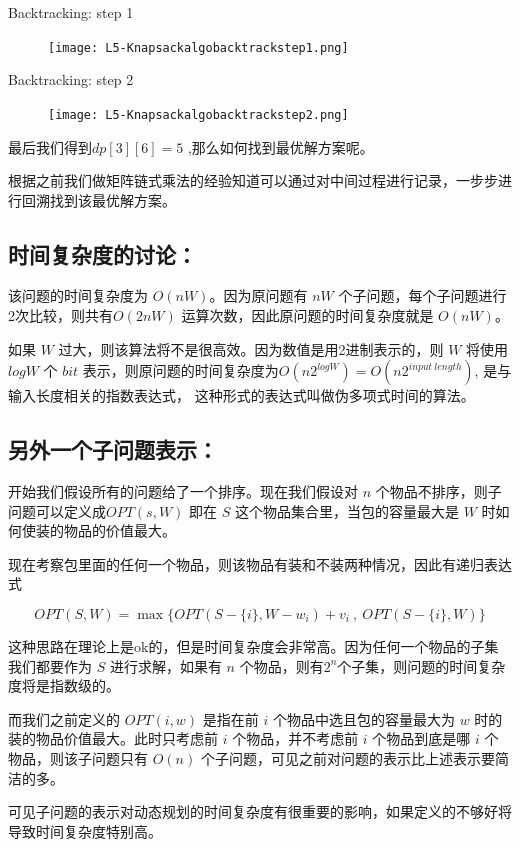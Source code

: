     Backtracking: step 1
	\begin{figure}
	\texttt{[image: L5-Knapsackalgobacktrackstep1.png]}
	\end{figure}

    Backtracking: step 2
	\begin{figure}
	\texttt{[image: L5-Knapsackalgobacktrackstep2.png]}
	\end{figure}

\newpage

最后我们得到$dp[3][6] = 5$ ,那么如何找到最优解方案呢。

根据之前我们做矩阵链式乘法的经验知道可以通过对中间过程进行记录，一步步进行回溯找到该最优解方案。

\subsection{时间复杂度的讨论：}

该问题的时间复杂度为 $O(nW)$。因为原问题有 $nW$ 个子问题，每个子问题进行2次比较，则共有$O(2nW)$ 运算次数，因此原问题的时间复杂度就是 $O(nW)$。

如果 $W$ 过大，则该算法将不是很高效。因为数值是用2进制表示的，则 $W$ 将使用 $logW$ 个 $bit$ 表示，则原问题的时间复杂度为$O(n2^{logW}) = O(n2^{input ~ length})$, 是与输入长度相关的指数表达式， 这种形式的表达式叫做伪多项式时间的算法。

\subsection{另外一个子问题表示：}

开始我们假设所有的问题给了一个排序。现在我们假设对 $n$ 个物品不排序，则子问题可以定义成$OPT(s,W)$ 即在 $S$ 这个物品集合里，当包的容量最大是 $W$ 时如何使装的物品的价值最大。

现在考察包里面的任何一个物品，则该物品有装和不装两种情况，因此有递归表达式

\[OPT( S,W  )=\max\{ OPT(S-\{i\}, W - w_i) + v_i ~, ~ OPT(S-\{i\}, W) \}\]

这种思路在理论上是ok的，但是时间复杂度会非常高。因为任何一个物品的子集我们都要作为 $S$ 进行求解，如果有 $n$ 个物品，则有$2^n$个子集，则问题的时间复杂度将是指数级的。


而我们之前定义的 $OPT(i,w)$ 是指在前 $i$ 个物品中选且包的容量最大为 $w$ 时的装的物品价值最大。此时只考虑前 $i$ 个物品，并不考虑前 $i$ 个物品到底是哪 $i$ 个物品，则该子问题只有 $O(n)$ 个子问题，可见之前对问题的表示比上述表示要简洁的多。

可见子问题的表示对动态规划的时间复杂度有很重要的影响，如果定义的不够好将导致时间复杂度特别高。


